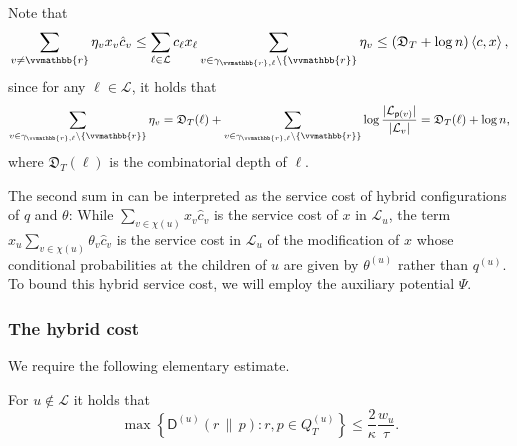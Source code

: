 \documentclass{toc}
\newcommand{\calL}{\mathcal L}
\newcommand{\dmid}{\,\|\,}
\newcommand{\depth}{\mathfrak{D}}
\newcommand{\vvr}{\vvmathbb{r}}
\newcommand{\sfp}{\mathsf{p}}
\newcommand{\sfD}{\mathsf D}
\newcommand{\llangle}{\left\langle}
\newcommand{\rrangle}{\right\rangle}
\begin{document}
Note that
\begin{align}\label{eq:mv2}
\sum_{v \neq \vvr} \eta_v x_v \hat{c}_v \leq \sum_{\ell \in \calL} c_{\ell} x_{\ell} \sum_{v \in \gamma_{\vvr,\ell} \setminus \{\vvr\}} \eta_v
\leq (\depth_T + \log n) \llangle c,x\rrangle,
\end{align}
since for any $\ell \in \calL$, it holds that
\begin{align*}
\sum_{v \in \gamma_{\vvr,\ell} \setminus \{\vvr\}} \eta_v = \depth_T(\ell) + \sum_{v \in \gamma_{\vvr,\ell} \setminus \{\vvr\}} \log \frac{|\calL_{\sfp(v)}|}{|\calL_v|} =
\depth_T(\ell) + \log n,
\end{align*}
where $\depth_T(\ell)$ is the combinatorial depth of $\ell$.

The second sum in  can be interpreted as the service cost of hybrid configurations of $q$ and $\theta$: While $\sum_{v\in\chi(u)}x_v\hat{c}_v$ is the service cost of $x$ in $\calL_u$, the term $x_u\sum_{v\in\chi(u)}\theta_v\hat{c}_v$ is the service cost in $\calL_u$ of the modification of $x$ whose conditional probabilities at the children of $u$ are given by $\theta^{(u)}$ rather than $q^{(u)}$. To bound this hybrid service cost, we will employ the auxiliary potential $\Psi$.


\subsubsection{The hybrid cost}
\label{sec:hybrid}

We require the following elementary estimate.

\begin{lemma}\label{lem:dmax}
	For $u \notin \calL$ it holds that
	\begin{equation*}\label{eq:dmax}
	\max \left\{ \sfD^{(u)}(r \dmid p) : r,p \in Q^{(u)}_T \right\} \leq \frac{2}{\kappa} \frac{w_u}{\tau}.
	\end{equation*}
\end{lemma}
\end{document}
